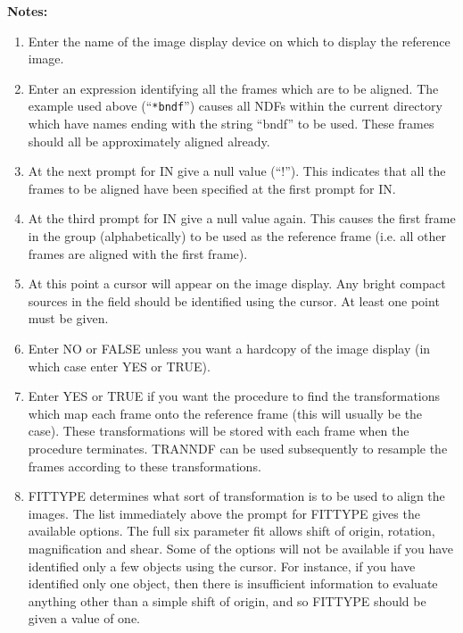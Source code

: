 {\bf Notes:}
\begin{enumerate}

\item Enter the name of the image display device on which to display
the reference image.

\item Enter an expression identifying all the frames which are to be
aligned.  The example used above (``\verb+*bndf+'') causes all {\small
NDF}s within the current directory which have names ending with the
string ``bndf'' to be used.  These frames should all be approximately
aligned already.

\item At the next prompt for IN give a null value (``!''). This
indicates that all the frames to be aligned have been specified at the
first prompt for IN.

\item At the third prompt for IN give a null value again. This causes
the first frame in the group (alphabetically) to be used as the
reference frame (i.e. all other frames are aligned with the first
frame).

\item At this point a cursor will appear on the image display. Any
bright compact sources in the field should be identified using the
cursor. At least one point must be given.

\item Enter NO or FALSE unless you want a hardcopy of the image display
(in which case enter YES or TRUE).

\item Enter YES or TRUE if you want the procedure to find the
transformations which map each frame onto the reference frame (this
will usually be the case). These transformations will be stored with
each frame when the procedure terminates. {\small TRANNDF} can be used
subsequently to resample the frames according to these
transformations.

\item FITTYPE determines what sort of transformation is to be used to
align the images. The list immediately above the prompt for FITTYPE
gives the available options. The full six parameter fit allows shift of
origin, rotation, magnification and shear. Some of the options will not
be available if you have identified only a few objects using the
cursor. For instance, if you have identified only one object, then
there is insufficient information to evaluate anything other than a
simple shift of origin, and so FITTYPE should be given a value of one.

\end{enumerate}


